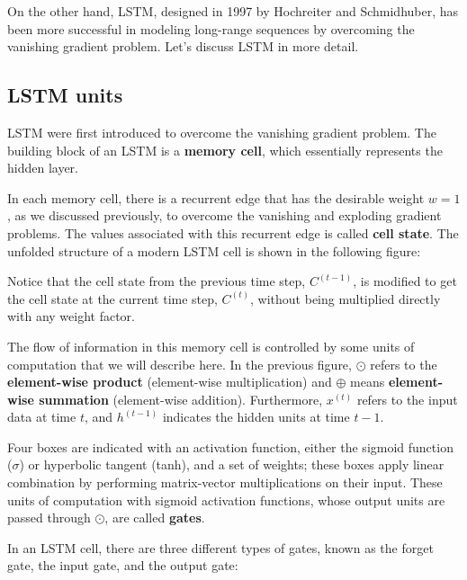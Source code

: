 \documentclass[11pt]{article}
\begin{document}
On the other hand, LSTM, designed in 1997 by Hochreiter and Schmidhuber,
has been more successful in modeling long-range sequences by overcoming
the vanishing gradient problem. Let's discuss LSTM in more detail.

    \subsection{LSTM units}\label{lstm-units}

    LSTM were first introduced to overcome the vanishing gradient problem.
The building block of an LSTM is a \textbf{memory cell}, which
essentially represents the hidden layer.

In each memory cell, there is a recurrent edge that has the desirable
weight \(w=1\), as we discussed previously, to overcome the vanishing
and exploding gradient problems. The values associated with this
recurrent edge is called \textbf{cell state}. The unfolded structure of
a modern LSTM cell is shown in the following figure:

    Notice that the cell state from the previous time step, \(C^{(t-1)}\),
is modified to get the cell state at the current time step, \(C^{(t)}\),
without being multiplied directly with any weight factor.

The flow of information in this memory cell is controlled by some units
of computation that we will describe here. In the previous figure,
\(\odot\) refers to the \textbf{element-wise product} (element-wise
multiplication) and \(\oplus\) means \textbf{element-wise summation}
(element-wise addition). Furthermore, \(x^{(t)}\) refers to the input
data at time \(t\), and \(h^{(t-1)}\) indicates the hidden units at time
\(t-1\).

Four boxes are indicated with an activation function, either the sigmoid
function (\(\sigma\)) or hyperbolic tangent (tanh), and a set of
weights; these boxes apply linear combination by performing
matrix-vector multiplications on their input. These units of computation
with sigmoid activation functions, whose output units are passed through
\(\odot\), are called \textbf{gates}.

In an LSTM cell, there are three different types of gates, known as the
forget gate, the input gate, and the output gate:
\end{document}
